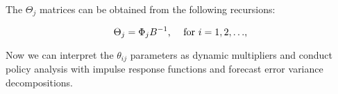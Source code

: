 \documentclass[11pt]{article}
\begin{document}
\vspace{3.5mm}
The $\Theta_{j}$ matrices can be obtained from the following recursions:

\begin{equation*}
\Theta_{j} = \Phi_{j} B^{-1} \mbox{, \quad for $i = 1, 2, \ldots$,}
\end{equation*}

\vspace{3.5mm}
Now we can interpret the $\theta_{ij}$ parameters as dynamic multipliers and conduct policy analysis with
impulse response functions and forecast error variance decompositions.
\end{document}
